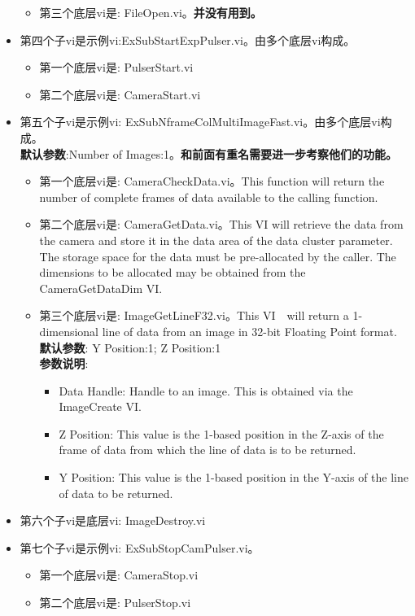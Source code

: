 \begin{itemize}
\begin{itemize}
\item 第三个底层vi是: FileOpen.vi。\textbf{并没有用到。}
\end{itemize}

\item 第四个子vi是示例vi:ExSubStartExpPulser.vi。由多个底层vi构成。
\begin{itemize}
\item 第一个底层vi是: PulserStart.vi
\item 第二个底层vi是: CameraStart.vi
\end{itemize}

\item 第五个子vi是示例vi: ExSubNframeColMultiImageFast.vi。由多个底层vi构成。
\\ \textbf{默认参数}:Number of Images:1。\textbf{和前面有重名需要进一步考察他们的功能。} 
\begin{itemize}
\item 第一个底层vi是: CameraCheckData.vi。This function will return the number of complete frames of data available to the calling function.
\item 第二个底层vi是: CameraGetData.vi。This VI will retrieve the data from the camera 
and store it in the data area of the data cluster parameter. The storage space for the
data must be pre-allocated by the caller. The dimensions to be allocated may be obtained
from the CameraGetDataDim VI.
\item 第三个底层vi是: ImageGetLineF32.vi。This VI　will return a 1-dimensional line of data from an image in 32-bit Floating Point format. 
\\ \textbf{默认参数}: Y Position:1; Z Position:1
\\ \textbf{参数说明}:
\begin{itemize}
\item Data Handle: Handle to an image. This is obtained via the ImageCreate VI.
\item Z Position: This value is the 1-based position in the Z-axis of the frame of data from which the line of data is to be returned.
\item Y Position: This value is the 1-based position in the Y-axis of the line of data to be returned.
\end{itemize} 	
\end{itemize}

\item 第六个子vi是底层vi: ImageDestroy.vi

\item 第七个子vi是示例vi: ExSubStopCamPulser.vi。
\begin{itemize}
\item 第一个底层vi是: CameraStop.vi
\item 第二个底层vi是: PulserStop.vi
\end{itemize}
\end{itemize}













